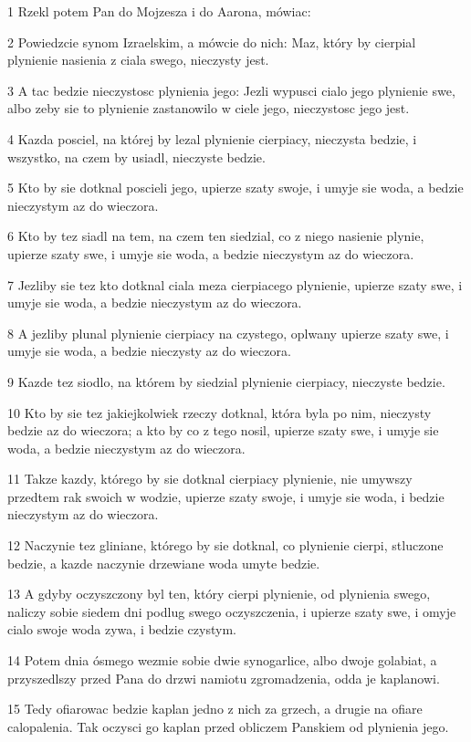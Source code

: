 \par 1 Rzekl potem Pan do Mojzesza i do Aarona, mówiac:
\par 2 Powiedzcie synom Izraelskim, a mówcie do nich: Maz, który by cierpial plynienie nasienia z ciala swego, nieczysty jest.
\par 3 A tac bedzie nieczystosc plynienia jego: Jezli wypusci cialo jego plynienie swe, albo zeby sie to plynienie zastanowilo w ciele jego, nieczystosc jego jest.
\par 4 Kazda posciel, na której by lezal plynienie cierpiacy, nieczysta bedzie, i wszystko, na czem by usiadl, nieczyste bedzie.
\par 5 Kto by sie dotknal poscieli jego, upierze szaty swoje, i umyje sie woda, a bedzie nieczystym az do wieczora.
\par 6 Kto by tez siadl na tem, na czem ten siedzial, co z niego nasienie plynie, upierze szaty swe, i umyje sie woda, a bedzie nieczystym az do wieczora.
\par 7 Jezliby sie tez kto dotknal ciala meza cierpiacego plynienie, upierze szaty swe, i umyje sie woda, a bedzie nieczystym az do wieczora.
\par 8 A jezliby plunal plynienie cierpiacy na czystego, oplwany upierze szaty swe, i umyje sie woda, a bedzie nieczysty az do wieczora.
\par 9 Kazde tez siodlo, na którem by siedzial plynienie cierpiacy, nieczyste bedzie.
\par 10 Kto by sie tez jakiejkolwiek rzeczy dotknal, która byla po nim, nieczysty bedzie az do wieczora; a kto by co z tego nosil, upierze szaty swe, i umyje sie woda, a bedzie nieczystym az do wieczora.
\par 11 Takze kazdy, którego by sie dotknal cierpiacy plynienie, nie umywszy przedtem rak swoich w wodzie, upierze szaty swoje, i umyje sie woda, i bedzie nieczystym az do wieczora.
\par 12 Naczynie tez gliniane, którego by sie dotknal, co plynienie cierpi, stluczone bedzie, a kazde naczynie drzewiane woda umyte bedzie.
\par 13 A gdyby oczyszczony byl ten, który cierpi plynienie, od plynienia swego, naliczy sobie siedem dni podlug swego oczyszczenia, i upierze szaty swe, i omyje cialo swoje woda zywa, i bedzie czystym.
\par 14 Potem dnia ósmego wezmie sobie dwie synogarlice, albo dwoje golabiat, a przyszedlszy przed Pana do drzwi namiotu zgromadzenia, odda je kaplanowi.
\par 15 Tedy ofiarowac bedzie kaplan jedno z nich za grzech, a drugie na ofiare calopalenia. Tak oczysci go kaplan przed obliczem Panskiem od plynienia jego.
